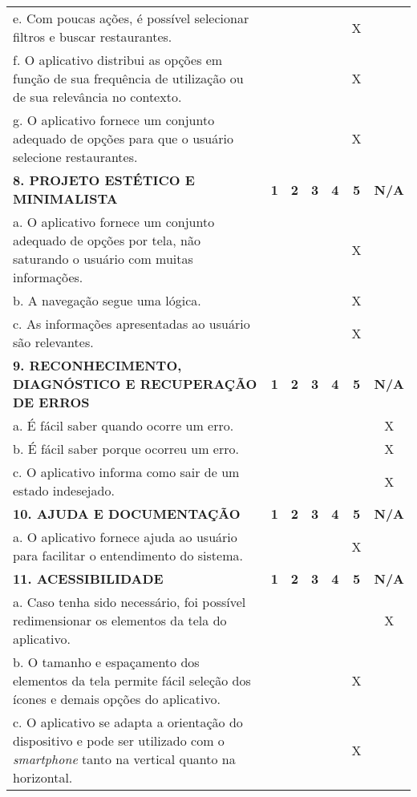\documentclass[portuguese,oneside]{tcc}
\begin{document}
\begin{center}
\begin{longtabu}{|L{25em}|c|c|c|c|c|c|}
	e. Com poucas ações, é possível selecionar filtros e buscar restaurantes. & & & & & X & \\ 
	f. O aplicativo distribui as opções em função de sua frequência de utilização ou de sua relevância no contexto.	& & & & & X & \\ 
	g. O aplicativo fornece um conjunto adequado de opções para que o usuário selecione restaurantes. & & & & & X & \\ 
	\textbf{8. PROJETO ESTÉTICO E MINIMALISTA} & \textbf{1} & \textbf{2} & \textbf{3} & \textbf{4} & \textbf{5} & \textbf{N/A} \\ 
	a. O aplicativo fornece um conjunto adequado de opções por tela, não saturando o usuário com muitas informações. & & & & & X & \\ 
	b. A navegação segue uma lógica. & & & & & X & \\ 
	c. As informações apresentadas ao usuário são relevantes. & & & & & X & \\ 
	\textbf{9. RECONHECIMENTO, DIAGNÓSTICO E RECUPERAÇÃO DE ERROS} & \textbf{1} & \textbf{2} & \textbf{3} & \textbf{4} & \textbf{5} & \textbf{N/A} \\ 
	a. É fácil saber quando ocorre um erro.	& & & & & & X \\ 
	b. É fácil saber porque ocorreu um erro. & & & & & & X \\ 
	c. O aplicativo informa como sair de um estado indesejado. & & & & & & X \\ 
	\textbf{10. AJUDA E DOCUMENTAÇÃO} & \textbf{1} & \textbf{2} & \textbf{3} & \textbf{4} & \textbf{5} & \textbf{N/A} \\ 
	a. O aplicativo fornece ajuda ao usuário para facilitar o entendimento do sistema. & & & & & X & \\ 
	\textbf{11. ACESSIBILIDADE} & \textbf{1} & \textbf{2} & \textbf{3} & \textbf{4} & \textbf{5} & \textbf{N/A} \\ 
	a. Caso tenha sido necessário, foi possível redimensionar os elementos da tela do aplicativo. & & & & & & X \\ 
	b. O tamanho e espaçamento dos elementos da tela permite fácil seleção dos ícones e demais opções do aplicativo. & & & & & X & \\ 
	c. O aplicativo se adapta a orientação do dispositivo e pode ser utilizado com o \emph{smartphone} tanto na vertical quanto na horizontal. & & & & & X & \\ 

\end{longtabu}
\end{center}
\end{document}
